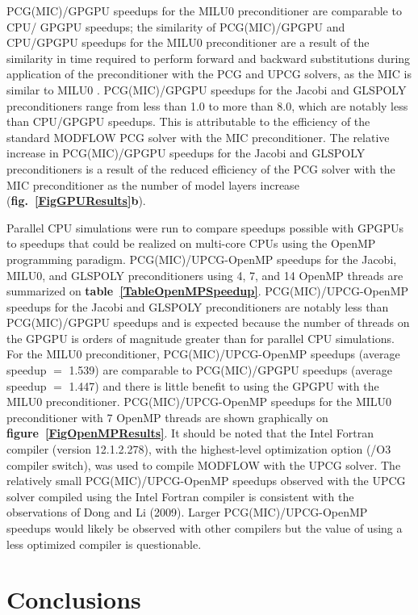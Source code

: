 \documentclass[12pt]{article}
\begin{document}
PCG(MIC)/GPGPU speedups for the MILU0 preconditioner are comparable to CPU/ GPGPU speedups; the similarity of PCG(MIC)/GPGPU and CPU/GPGPU speedups for the MILU0 preconditioner are a result of the similarity in time required to perform forward and backward substitutions during application of the preconditioner with the PCG and UPCG solvers, as the MIC is similar to MILU0 . PCG(MIC)/GPGPU speedups for the Jacobi and GLSPOLY preconditioners range from less than 1.0 to more than 8.0, which are notably less than CPU/GPGPU speedups.  This is attributable to the efficiency of the standard MODFLOW PCG solver with the MIC preconditioner. The relative increase in PCG(MIC)/GPGPU speedups for the Jacobi and GLSPOLY preconditioners is a result of the reduced efficiency of the PCG solver with the MIC preconditioner as the number of model layers increase (\textbf{fig.~\ref{FigGPUResults}b}).

Parallel CPU simulations were run to compare speedups possible with GPGPUs to speedups that could be realized on multi-core CPUs using the OpenMP programming paradigm. PCG(MIC)/UPCG-OpenMP speedups for the Jacobi, MILU0, and GLSPOLY preconditioners using 4, 7, and 14 OpenMP threads are summarized on \textbf{table~\ref{TableOpenMPSpeedup}}. PCG(MIC)/UPCG-OpenMP speedups for the Jacobi and GLSPOLY preconditioners are notably less than PCG(MIC)/GPGPU speedups and is expected because the number of threads on the GPGPU is orders of magnitude greater than for parallel CPU simulations. For the MILU0 preconditioner, PCG(MIC)/UPCG-OpenMP speedups (average speedup $=$ 1.539) are comparable to PCG(MIC)/GPGPU speedups (average speedup $=$ 1.447) and there is little benefit to using the GPGPU with the MILU0 preconditioner. PCG(MIC)/UPCG-OpenMP speedups for the MILU0 preconditioner with 7 OpenMP threads are shown graphically on \textbf{figure~\ref{FigOpenMPResults}}. It should be noted that the Intel Fortran compiler (version 12.1.2.278), with the highest-level optimization option (/O3 compiler switch), was used to compile MODFLOW with the UPCG solver. The relatively small PCG(MIC)/UPCG-OpenMP speedups observed with the UPCG solver compiled using the Intel Fortran compiler is consistent with the observations of Dong and Li (2009). Larger PCG(MIC)/UPCG-OpenMP speedups would likely be observed with other compilers but the value of using a less optimized compiler is questionable.


\section* {\bf Conclusions}
\end{document}
